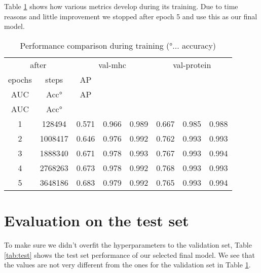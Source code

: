 \documentclass[msc,deptreport,ai]{infthesis} %
\begin{document}
		Table \ref{tab:training} shows how various metrics develop during its training. Due to time reasons and little improvement we stopped after epoch 5 and use this as our final model.
		
		\begin{table}[H]
			\vskip 3mm
			\begin{center}
			\begin{small}
			\begin{sc}
			\begin{tabular}{| c c | c c c | c c c |}	
			\hline
			\multicolumn{2}{|c|}{after}				& \multicolumn{3}{c|}{val-mhc}		& \multicolumn{3}{c|}{val-protein} \\
			epochs			& steps			& \gls{AP}	& {\tiny\makecell{\gls{ROC}\\ \gls{AUC}}}	& Acc°  	& \gls{AP} 	& {\tiny\makecell{\gls{ROC}\\\gls{AUC}}}	& Acc° \\
			\hline
			\hline
			1 & 128494 & 0.571 & 0.966 & 0.989 & 0.667 & 0.985 & 0.988 \\
			\hline
			2 & 1008417 & 0.646 & 0.976 & 0.992 & 0.762 & 0.993 & 0.993 \\
			\hline
			3 & 1888340 & 0.671 & 0.978 & 0.993 & 0.767 & 0.993 & 0.994 \\
			\hline
			4 & 2768263 & 0.673 & 0.978 & 0.992 & 0.768 & 0.993 & 0.993 \\
			\hline
			5 & 3648186 & 0.683 & 0.979 & 0.992 & 0.765 & 0.993 & 0.994 \\			
			\hline
			\end{tabular}
			\end{sc}
			\end{small}
			\caption{Performance comparison during training (°... accuracy)}
			\label{tab:training}
			\end{center}
			\vskip -7mm
		\end{table}	

	\section{Evaluation on the test set}
	\label{sec:results_test_set}

		To make sure we didn't overfit the hyperparameters to the validation set, Table \ref{tab:test} shows the test set performance of our selected final model. We see that the values are not very different from the ones for the validation set in Table \ref{tab:training}.
\end{document}
